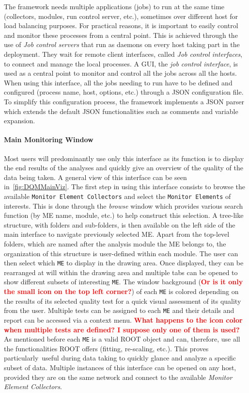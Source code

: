 \documentclass{webofc}
\begin{document}
The framework needs multiple applications (jobs) to run at the same time (collectors, modules, run control server, etc.), sometimes over different host for load balancing purposes.
For practical reasons, it is important to easily control and monitor these processes from a central point.
This is achieved through the use of \textit{Job control servers} that run as daemons on every host taking part in the deployment.
They wait for remote client interfaces, called \textit{Job control interfaces}, to connect and manage the local processes.
A GUI, the \textit{job control interface}, is used as a central point to monitor and control all the jobs across all the hosts.
When using this interface, all the jobs needing to run have to be defined and configured (process name, host, options, etc.) through a JSON configuration file.
To simplify this configuration process, the framework implements a JSON parser which extends the default JSON functionalities such as comments and variable expansion.

\paragraph{Main Monitoring Window}\label{par:MainGUI}

Most users will predominantly use only this interface as its function is to display the end results of the analyses and quickly give an overview of the quality of the data being taken.
A general view of this interface can be seen in~\autoref{fig:DQMMainViz}.
The first step in using this interface consists to browse the available \texttt{Monitor Element Collectors} and select the \texttt{Monitor Elements} of interests.
This is done through the \textit{browse} window which provides various search function (by ME name, module, etc.) to help construct this selection.
A tree-like structure, with folders and sub-folders, is then available on the left side of the main interface to navigate previously selected ME.
Apart from the top-level folders, which are named after the analysis module the ME belongs to, the organization of this structure is user-defined within each module.
The user can then select which \texttt{ME} to display in the drawing area.
Once displayed, they can be rearranged at will within the drawing area and multiple tabs can be opened to show different subsets of interesting \texttt{ME}.
The window background (\textcolor{red}{\textbf{Or is it only the small icon on the top left corner?}}) of each \texttt{ME} is colored depending on the results of its selected quality test for a quick visual assessment of its quality from the user.
Multiple tests can be assigned to each \texttt{ME} and their details and report can be accessed via a context menu. \textcolor{red}{\textbf{What happens to the icon color when multiple tests are defined? I suppose only one of them is used?}}
As mentioned before each \texttt{ME} is a valid ROOT object and can, therefore, use all the functionalities ROOT offers (fitting, re-scaling, etc.).
This proves particularly useful during data taking to quickly glance and analyze a specific subset of data.
Multiple instances of this interface can be opened on any host, provided they are on the same network and connect to the available \textit{Monitor Element Collectors}.
\end{document}
